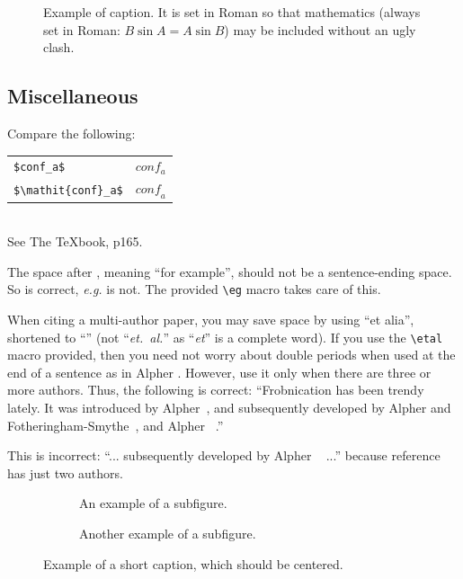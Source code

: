 \documentclass[10pt,twocolumn,letterpaper]{article}
\begin{document}
\begin{figure}[t]
  \centering
  \fbox{\rule{0pt}{2in} \rule{0.9\linewidth}{0pt}}

   \caption{Example of caption.
   It is set in Roman so that mathematics (always set in Roman: $B \sin A = A \sin B$) may be included without an ugly clash.}
   \label{fig:onecol}
\end{figure}

\subsection{Miscellaneous}

\noindent
Compare the following:\\
\begin{tabular}{ll}
 \verb'$conf_a$' &  $conf_a$ \\
 \verb'$\mathit{conf}_a$' & $\mathit{conf}_a$
\end{tabular}\\
See The \TeX book, p165.

The space after \eg, meaning ``for example'', should not be a sentence-ending space.
So \eg is correct, {\em e.g.} is not.
The provided \verb'\eg' macro takes care of this.

When citing a multi-author paper, you may save space by using ``et alia'', shortened to ``\etal'' (not ``{\em et.\ al.}'' as ``{\em et}'' is a complete word).
If you use the \verb'\etal' macro provided, then you need not worry about double periods when used at the end of a sentence as in Alpher \etal.
However, use it only when there are three or more authors.
Thus, the following is correct:
   ``Frobnication has been trendy lately.
   It was introduced by Alpher~\cite{Alpher02}, and subsequently developed by
   Alpher and Fotheringham-Smythe~\cite{Alpher03}, and Alpher \etal~\cite{Alpher04}.''

This is incorrect: ``... subsequently developed by Alpher \etal~\cite{Alpher03} ...'' because reference~\cite{Alpher03} has just two authors.




\begin{figure}
  \centering
  \begin{subfigure}{0.68\linewidth}
    \fbox{\rule{0pt}{2in} \rule{.9\linewidth}{0pt}}
    \caption{An example of a subfigure.}
    \label{fig:short-a}
  \end{subfigure}
  \hfill
  \begin{subfigure}{0.28\linewidth}
    \fbox{\rule{0pt}{2in} \rule{.9\linewidth}{0pt}}
    \caption{Another example of a subfigure.}
    \label{fig:short-b}
  \end{subfigure}
  \caption{Example of a short caption, which should be centered.}
  \label{fig:short}
\end{figure}
\end{document}
